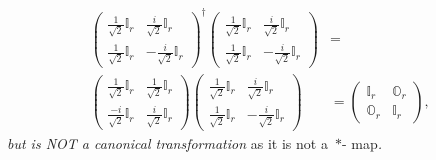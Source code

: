\documentclass[aps, preprint]{revtex4}
\begin{document}
\begin{align}\left (\begin{array}{cc}\frac{1}{\sqrt{2}} \mathbb{I}_{r} & \frac{i}{\sqrt{2}} \mathbb{I}_{r} \\
\frac{1}{\sqrt{2}} \mathbb{I}_{r} &  -\frac{i}{\sqrt{2}} \mathbb{I}_{r}\end{array}\right )^{ \dag } \left (\begin{array}{cc}\frac{1}{\sqrt{2}} \mathbb{I}_{r} & \frac{i}{\sqrt{2}} \mathbb{I}_{r} \\
\frac{1}{\sqrt{2}} \mathbb{I}_{r} &  -\frac{i}{\sqrt{2}} \mathbb{I}_{r}\end{array}\right ) &  = \\
\left (\begin{array}{cc}\frac{1}{\sqrt{2}} \mathbb{I}_{r} & \frac{1}{\sqrt{2}} \mathbb{I}_{r} \\
\frac{ -i}{\sqrt{2}} \mathbb{I}_{r} & \frac{i}{\sqrt{2}} \mathbb{I}_{r}\end{array}\right ) \left (\begin{array}{cc}\frac{1}{\sqrt{2}} \mathbb{I}_{r} & \frac{i}{\sqrt{2}} \mathbb{I}_{r} \\
\frac{1}{\sqrt{2}} \mathbb{I}_{r} &  -\frac{i}{\sqrt{2}} \mathbb{I}_{r}\end{array}\right ) &  =\left (\begin{array}{cc}\mathbb{I}_{r} & \mathbb{O}_{r} \\
\mathbb{O}_{r} & \mathbb{I}_{r}\end{array}\right )\text{,}\end{align}\emph{but is NOT a canonical transformation }as it is not a\emph{\ }$ \ast $- map\emph{. } 
\end{document}
